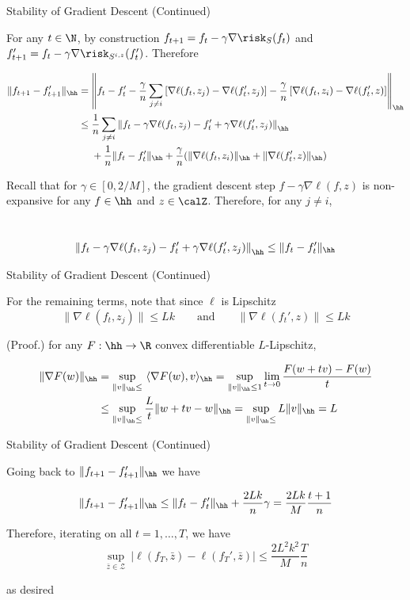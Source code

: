 \documentclass[10pt,mathserif]{beamer}
\begin{document}
\begin{frame}{Stability of Gradient Descent (Continued)}

For any $t\in\N$, by construction $f_{t+1} = f_t - \gamma \nabla\risk_{S}(f_t)$ and $f_{t+1}' = f_t - \gamma \nabla\risk_{S^{i,z}}(f_t')$. Therefore 

{\scriptsize
\begin{align*}
\|f_{t+1} - f_{t+1}'\|_\hh & = \left\|f_t - f_t' - \frac{\gamma}{n} \sum_{j\neq i} \left[ \nabla\ell(f_t,z_j) - \nabla\ell(f_t',z_j) \right] - \frac{\gamma}{n} \left[\nabla\ell(f_t,z_i) - \nabla\ell(f_t',z)\right]\right\|_\hh \\ 
  & \leq \frac{1}{n} \sum_{j\neq i} \left\|f_t - \gamma\nabla\ell(f_t,z_j) - f_t' + \gamma\nabla\ell(f_t',z_j)\right\|_\hh \\
  & ~~~~ + \frac{1}{n} \|f_t - f_t'\|_\hh + \frac{\gamma}{n} (\|\nabla\ell(f_t,z_i)\|_\hh + \|\nabla\ell(f_t',z)\|_\hh) \\
\end{align*}
}

Recall that for $\gamma\in[0,2/M]$, the gradient descent step $f - \gamma\nabla\ell(f,z)$ is non-expansive for any $f \in\hh$ and $z\in\calZ$. Therefore, for any $j\neq i$,

\ \\
{
\footnotesize
$$
\left\|f_t - \gamma\nabla\ell(f_t,z_j) - f_t' + \gamma\nabla\ell(f_t',z_j)\right\|_\hh\leq \|f_t - f_t'\|_\hh
$$
}
\vfill
\end{frame}

\begin{frame}{Stability of Gradient Descent (Continued)}

For the remaining terms, note that since $\ell$ is Lipschitz
$$
\|\nabla\ell(f_t,z_j)\|\leq Lk \qquad \textrm{and} \qquad \|\nabla\ell(f_t',z)\|\leq Lk
$$

(Proof.) for any $F:\hh\to\R$ convex differentiable $L$-Lipschitz,  


{
\footnotesize
\begin{align*}
\|\nabla F(w)\|_\hh & = \sup_{\|v\|_\hh\leq} ~\langle \nabla F(w),v\rangle_\hh = \sup_{\|v\|_\hh\leq 1} \lim_{t\to0} \frac{F(w + tv)- F(w)}{t} \\
&  \leq \sup_{\|v\|_\hh\leq} \frac{L}{t}\|w + tv - w\|_\hh = \sup_{\|v\|_\hh\leq} L \|v\|_\hh = L
\end{align*}
}


\end{frame}


\begin{frame}{Stability of Gradient Descent (Continued)}

Going back to $\|f_{t+1} - f_{t+1}'\|_\hh$ we have

$$
\|f_{t+1} - f_{t+1}'\|_\hh \leq \|f_t - f_t'\|_\hh + \frac{2Lk}{n}\gamma = \frac{2Lk}{M}\frac{t+1}{n}
$$

\vfill
Therefore, iterating on all $t=1,\dots,T$, we have 
$$
\sup_{\bar z\in\mathcal Z} ~ |\ell(f_T,\bar z) - \ell(f_T',\bar z)| \leq \frac{2L^2k^2}{M} \frac{T}{n}
$$

as desired
\end{frame}
\end{document}
